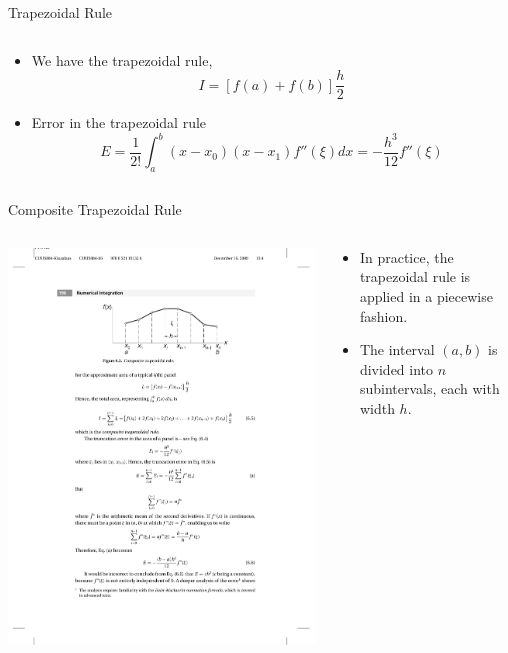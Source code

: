 \documentclass{beamer}
\newcommand{\beforeverb}{\footnotesize}
\newcommand{\afterverb}{\normalsize}
\begin{document}
\begin{frame}{Trapezoidal Rule}
\begin{columns}
\begin{column}{0.7\textwidth}
\begin{itemize}
\item We have the \alert{trapezoidal rule},
\beforeverb
\[
I=[f(a)+f(b)]\frac{h}{2}
\]
\afterverb
\item Error in the trapezoidal rule
\beforeverb
\[
E=\frac{1}{2!}\int_a^b (x-x_0)(x-x_1) f''(\xi) dx =-\frac{h^3}{12}f''(\xi)
\]
\afterverb
\end{itemize}
\afterverb
\end{column}
\end{columns}
\end{frame}
\begin{frame}{Composite Trapezoidal Rule}
\begin{columns}
\begin{column}{0.4\textwidth}
\centerline{\includegraphics[width=\textwidth]{Lec12_Fig3}}
\end{column}
\begin{column}{0.7\textwidth}
\begin{itemize}
\item In practice, the trapezoidal rule is applied in a \alert{piecewise} fashion.
\item The interval $(a,b)$ is divided into $n$ subintervals, each with width $h$.
\end{itemize}
\afterverb
\end{column}


\end{columns}
\end{frame}
\end{document}
